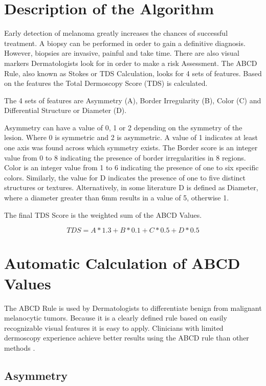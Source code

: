 \section{Description of the Algorithm}

Early detection of melanoma greatly increases the chances of successful treatment. A biopsy can be performed in order to gain a definitive diagnosis. However, biopsies are invasive, painful and take time. There are also visual markers Dermatologists look for in order to make a risk Assessment. The ABCD Rule, also known as Stokes or TDS Calculation, looks for 4 sets of features. Based on the features the Total Dermoscopy Score (TDS) is calculated.

The 4 sets of features are Asymmetry (A), Border Irregularity (B), Color (C) and Differential Structure or Diameter (D).

Asymmetry can have a value of 0, 1 or 2 depending on the symmetry of the lesion. Where 0 is symmetric and 2 is asymmetric. A value of 1 indicates at least one axis was found across which symmetry exists. The Border score is an integer value from 0 to 8 indicating the presence of border irregularities in 8 regions. Color is an integer value from 1 to 6 indicating the presence of one to six specific colors. Similarly, the value for D indicates the presence of one to five distinct structures or textures. Alternatively, in some literature\cite{Siddiq_2015} D is defined as Diameter, where a diameter greater than 6mm results in a value of 5, otherwise 1.

The final TDS Score is the weighted sum of the ABCD Values.

\begin{equation}
TDS = A * 1.3 + B * 0.1 + C * 0.5 + D * 0.5
\end{equation}

\section{Automatic Calculation of ABCD Values}

The ABCD Rule is used by Dermatologists to differentiate benign from malignant melanocytic tumors. Because it is a clearly defined rule based on easily recognizable visual features it is easy to apply. Clinicians with limited dermoscopy experience achieve better results using the ABCD rule than other methods \cite{Weigert_2012}.

\subsection{Asymmetry}

